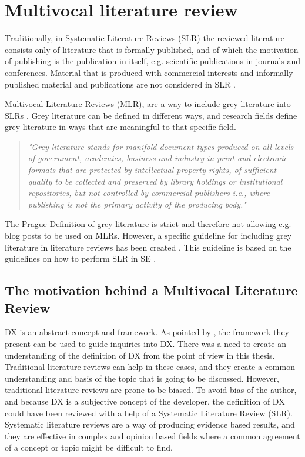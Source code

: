 \documentclass[english, 12pt, a4paper, sci, utf8, a-1b, online]{aaltothesis}
\begin{document}
\clearpage
\section{Multivocal literature review} \label{mlr}

Traditionally, in Systematic Literature Reviews (SLR) the reviewed literature consists only of literature that is formally published, and of which the motivation of publishing is the publication in itself, e.g. scientific publications in journals and conferences. Material that is produced with commercial interests and informally published material and publications are not considered in SLR \citep{guidelines-for-MLR}.

Multivocal Literature Reviews (MLR), are a way to include grey literature into SLRs \citep{the-need-for-MLR}. Grey literature can be defined in different ways, and research fields define grey literature in ways that are meaningful to that specific field.

\begin{quotation}
  \textit{"Grey literature stands for manifold document types produced on all levels of government, academics, business and industry in print and electronic formats that are protected by intellectual property rights, of sufficient quality to be collected and preserved by library holdings or institutional repositories, but not controlled by commercial publishers i.e., where publishing is not the primary activity of the producing body."} \citep{towards-a-prague-definition-of-grey-literature}
\end{quotation}

The Prague Definition of grey literature is strict and therefore not allowing e.g. blog posts to be used on MLRs. However, a specific guideline for including grey literature in literature reviews has been created \citep{guidelines-for-MLR}. This guideline is based on the guidelines on how to perform SLR in SE \citep{guidelines-for-SLR-in-SE}.

\subsection{The motivation behind a Multivocal Literature Review}

DX is an abstract concept and framework. As pointed by \cite{fagerholm-doctoral-thesis}, the framework they present can be used to guide inquiries into DX. There was a need to create an understanding of the definition of DX from the point of view in this thesis. Traditional literature reviews can help in these cases, and they create a common understanding and basis of the topic that is going to be discussed. However, traditional literature reviews are prone to be biased. To avoid bias of the author, and because DX is a subjective concept of the developer, the definition of DX could have been reviewed with a help of a Systematic Literature Review (SLR). Systematic literature reviews are a way of producing evidence based results, and they are effective in complex and opinion based fields where a common agreement of a concept or topic might be difficult to find.
\end{document}
